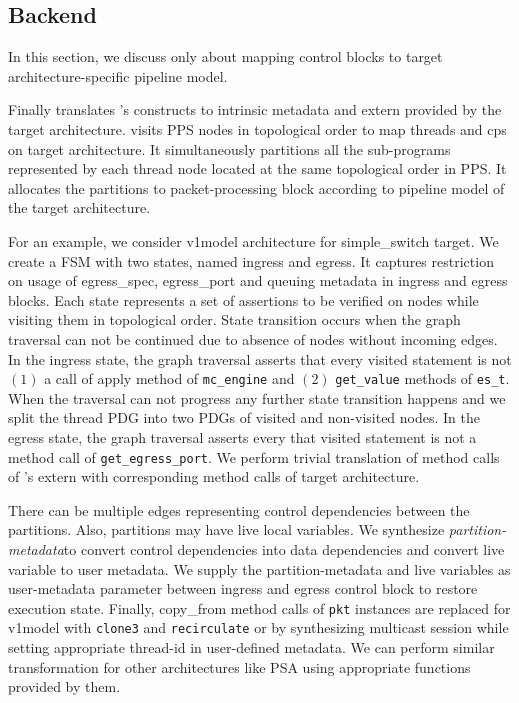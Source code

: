 \documentclass[letterpaper,twocolumn,10pt]{article}
\begin{document}


\subsection{\ucomp Backend}
In this section, we discuss only about mapping control blocks to 
target architecture-specific pipeline model.

\label{subsubsection:allocation-to-target-architecture}
Finally \ucomp translates \uarch's constructs to intrinsic metadata and extern provided by the target architecture.
\ucomp visits PPS nodes in topological order to map threads and cps on target architecture.
It simultaneously partitions all the sub-programs represented by each thread node located at the same topological order in PPS.
It allocates the partitions to packet-processing block according to pipeline model of the target architecture.

For an example, we consider v1model architecture for simple\_switch target.
We create a FSM with two states, named ingress and egress.
It captures restriction on usage of egress\_spec, egress\_port and queuing metadata in ingress and egress blocks.
Each state represents a set of assertions to be verified on nodes while visiting them in topological order.
State transition occurs when the graph traversal can not be continued due to absence of nodes without incoming edges.
In the ingress state, the graph traversal asserts that every visited statement is not $(1)$ a call of apply method of \texttt{mc\_engine}  and $(2)$ \texttt{get\_value} methods of \texttt{es\_t}.
When the traversal can not progress any further state transition happens and we split the thread PDG into two PDGs of visited and non-visited nodes.
In the egress state, the graph traversal asserts every that visited statement is not a method call of \texttt{get\_egress\_port}.
We perform trivial translation of method calls of \uarch's extern with corresponding method calls of target architecture.

There can be multiple edges representing control dependencies between the partitions.
Also, partitions may have live local variables.
We synthesize \emph{partition-metadata}to convert control dependencies into data dependencies and convert live variable to user metadata.
We supply the partition-metadata and live variables as user-metadata parameter between ingress and egress control block to restore execution state.
Finally, {copy\_from} method calls of \texttt{pkt} instances are replaced for v1model with \texttt{clone3} and \texttt{recirculate} or by synthesizing multicast session while setting appropriate thread-id in user-defined metadata.
We can perform similar transformation for other architectures like PSA using appropriate functions provided by them.
\end{document}
